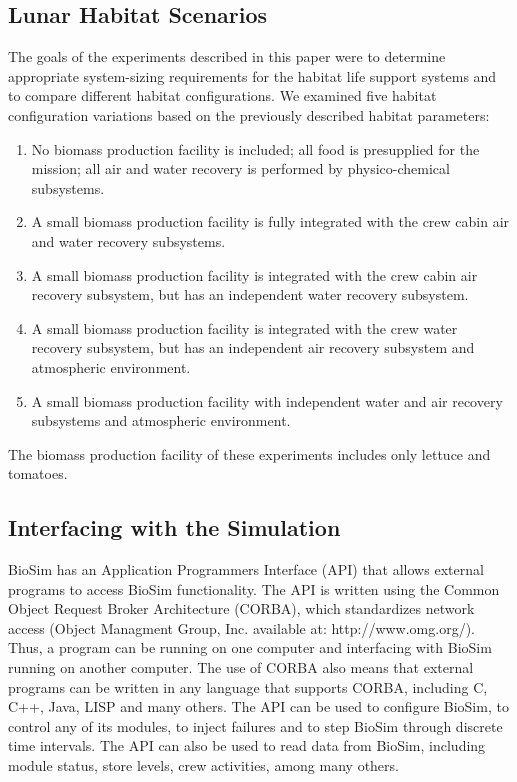 \documentclass[submit]{aiaa}
\begin{document}
\subsection{Lunar Habitat Scenarios}
\label{sec:scenarios}

The goals of the experiments described in this paper were to determine
appropriate system-sizing requirements for the habitat life support
systems and to compare different habitat configurations.   
We examined five  habitat configuration variations based on the previously
described habitat parameters: 

\begin{enumerate}
	\item No biomass production facility is included; all
	food is presupplied for the mission; all air and water
	recovery is performed by physico-chemical subsystems.

	\item A small biomass production facility is fully  integrated
	with the crew cabin air and water recovery subsystems.

	\item A small biomass production facility is  integrated with
	the crew cabin air recovery subsystem, but has an independent
	water recovery subsystem. 

	\item A small biomass production facility is integrated with
	the crew water recovery subsystem, but has an independent  air
	recovery subsystem and atmospheric environment.

	\item A small biomass production facility with independent
	water and air recovery subsystems and atmospheric
	environment. 
\end{enumerate}

The biomass production facility of these experiments includes only
lettuce and tomatoes. 

\subsection{Interfacing with the Simulation}

BioSim has an Application Programmers Interface (API) that allows
external programs to access BioSim functionality.  The API is written
using the Common Object Request Broker Architecture (CORBA), which
standardizes network access (Object Managment Group, Inc. available at: http://www.omg.org/).  Thus, a
program can be running on one computer and interfacing with BioSim
running on another computer.  The use of CORBA also means that
external programs can be written in any language that supports CORBA,
including C, C++, Java, LISP and many others.  The API can be used to
configure BioSim, to control any of its modules, to inject failures
and to step BioSim through discrete time intervals.  The API can also
be used to read data from BioSim, including module status, store
levels, crew activities, among many others. 
\end{document}
